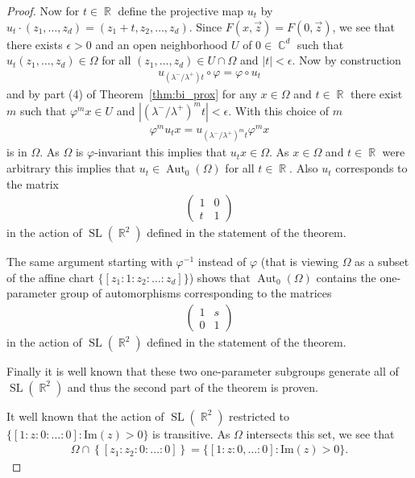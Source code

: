 \documentclass[12pt]{amsart}
\theoremstyle{plain}
\theoremstyle{definition}
\theoremstyle{remark}
\begin{document}
\begin{proof}
Now for $t \in \operatorname{\mathbb{R}}$ define the projective map $u_t$ by $u_t \cdot (z_1, \dots, z_d) = (z_1+t, z_2, \dots, z_d)$. Since $F(x,\vec{z}) = F(0,\vec{z})$, we see that there exists $\epsilon >0$ and an open neighborhood $U$ of $0 \in \operatorname{\mathbb{C}}^{d}$ such that $u_t (z_1, \dots, z_d) \in \Omega$ for all $(z_1,\dots, z_d) \in U \cap \Omega$ and ${\left|{t}\right|} < \epsilon$. Now by construction
\begin{align*}
u_{(\lambda^- /\lambda^+)t} \circ \varphi = \varphi \circ u_t
\end{align*}
and by part (4) of Theorem~\ref{thm:bi_prox} for any $x \in \Omega$ and $t \in \operatorname{\mathbb{R}}$ there exist $m$ such that $\varphi^m x \in U$ and ${\left|{(\lambda^-/\lambda^+)^m t}\right|} < \epsilon$. With this choice of $m$
\begin{align*}
\varphi^m u_t x = u_{(\lambda^-/\lambda^+)^m t} \varphi^m x
\end{align*}
is in $\Omega$. As $\Omega$ is $\varphi$-invariant this implies that $u_t x \in \Omega$. As $x \in \Omega$ and $t \in \operatorname{\mathbb{R}}$ were arbitrary this implies that $u_t \in \operatorname{Aut}_0(\Omega)$ for all $t \in \operatorname{\mathbb{R}}$. Also $u_t$ corresponds to the matrix 
\begin{align*}
\begin{pmatrix}
1 & 0 \\ 
t & 1 
\end{pmatrix}
\end{align*}
in the action of $\operatorname{SL}(\operatorname{\mathbb{R}}^2)$ defined in the statement of the theorem.

The same argument starting with $\varphi^{-1}$ instead of $\varphi$ (that is viewing $\Omega$ as a subset of the affine chart $\{ [z_1 : 1 : z_2 : \dots : z_d]\}$) shows that $\operatorname{Aut}_0(\Omega)$ contains the one-parameter group of automorphisms corresponding to the matrices
\begin{align*}
\begin{pmatrix}
1 & s \\ 
0 & 1 
\end{pmatrix}
\end{align*}
in the action of $\operatorname{SL}(\operatorname{\mathbb{R}}^2)$ defined in the statement of the theorem.  

Finally it is well known that these two one-parameter subgroups generate all of $\operatorname{SL}(\operatorname{\mathbb{R}}^2)$ and thus the second part of the theorem is proven. 

It well known that the action of $\operatorname{SL}(\operatorname{\mathbb{R}}^2)$ restricted to $\{ [1:z:0:\dots : 0] : \textrm{Im}(z) >0\}$ is transitive. As $\Omega$ intersects this set, we see that 
\begin{align*}
\Omega \cap \left\{ [ z_1: z_2 : 0 : \dots :0] \right\}= \{ [1:z: 0, \dots: 0] : \mathrm{Im}(z) >0\}.
\end{align*}

\end{proof}
\end{document}
